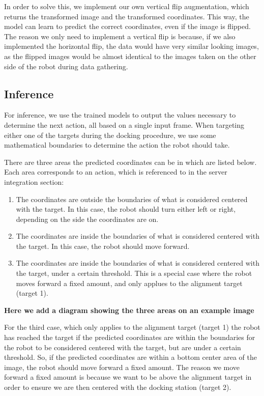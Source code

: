In order to solve this, we implement our own vertical flip augmentation, which returns the transformed image and the transformed coordinates. This way, the model can learn to predict the correct coordinates, even if the image is flipped. The reason we only need to implement a vertical flip is because, if we also implemented the horizontal flip, the data would have very similar looking images, as the flipped images would be almost identical to the images taken on the other side of the robot during data gathering.

\subsection{Inference}
For inference, we use the trained models to output the values necessary to determine the next action, all based on a single input frame. When targeting either one of the targets during the docking procedure, we use some mathematical boundaries to determine the action the robot should take.

There are three areas the predicted coordinates can be in which are listed below. Each area corresponds to an action, which is referenced to in the server integration section:

\begin{enumerate}
	\item The coordinates are outside the boundaries of what is considered centered with the target. In this case, the robot should turn either left or right, depending on the side the coordinates are on.
	\item The coordinates are inside the boundaries of what is considered centered with the target. In this case, the robot should move forward.
	\item The coordinates are inside the boundaries of what is considered centered with the target, under a certain threshold. This is a special case where the robot moves forward a fixed amount, and only applues to the alignment target (target 1).
\end{enumerate}

\textbf{Here we add a diagram showing the three areas on an example image}


For the third case, which only applies to the alignment target (target 1) the robot has reached the target if the predicted coordinates are within the boundaries for the robot to be considered centered with the target, but are under a certain threshold. So, if the predicted coordinates are within a bottom center area of the image, the robot should move forward a fixed amount. The reason we move forward a fixed amount is because we want to be above the alignment target in order to ensure we are then centered with the docking station (target 2).


